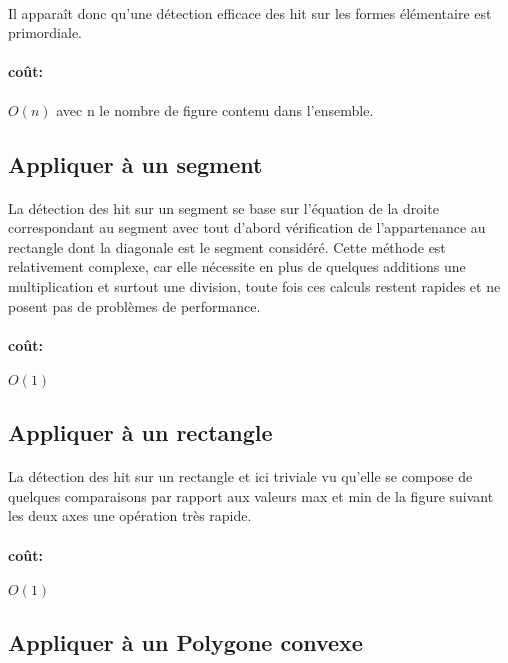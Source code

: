 \documentclass[a4paper, 12pts]{article}
\begin{document}
\paragraph{}
Il apparaît donc qu'une détection efficace des hit sur les formes élémentaire est primordiale.
\paragraph{coût: }
\(O(n)\) avec n le nombre de figure contenu dans l'ensemble.

\subsection{Appliquer à un segment}
\paragraph{}
La détection des hit sur un segment se base sur l’équation de la droite correspondant au segment avec tout d'abord vérification de l’appartenance au rectangle dont la diagonale est le segment considéré. Cette méthode est relativement complexe, car elle nécessite en plus de quelques additions une multiplication et surtout une division, toute fois ces calculs restent rapides et ne posent pas de problèmes de performance.
\paragraph{coût: }
\(O(1)\)

\subsection{Appliquer à un rectangle}
\paragraph{}
La détection des hit sur un rectangle et ici triviale vu qu'elle se compose de quelques comparaisons par rapport aux valeurs max et min de la figure suivant les deux axes une opération très rapide.
\paragraph{coût: }
\(O(1)\)

\subsection{Appliquer à un Polygone convexe}
\end{document}
